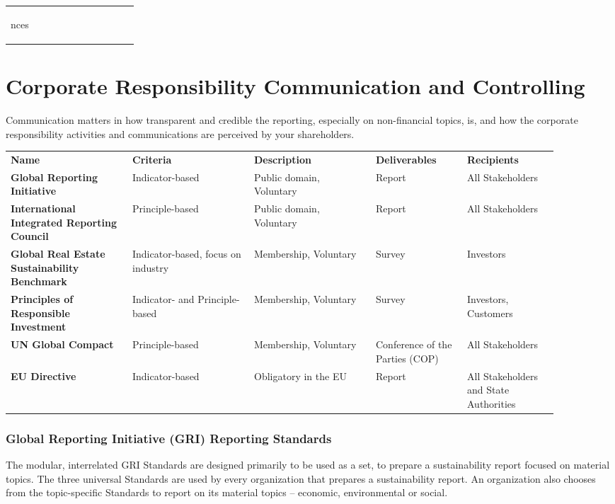 \documentclass[11pt]{article}
\theoremstyle{definition}
\begin{document}
\begin{tabularx}{\linewidth}{p{0.22\linewidth} | p{0.22\linewidth} | p{0.22\linewidth} | p{0.22\linewidth}}
\begin{itemize}
nces
	\end{itemize}
\end{tabularx}

\section{Corporate Responsibility Communication and Controlling}
Communication matters in how transparent and credible the reporting, especially on non-financial topics, is, and how the corporate responsibility activities and communications are perceived by your shareholders.

\begin{tabularx}{\linewidth}{p{0.2\linewidth} p{0.2\linewidth} p{0.2\linewidth} p{0.15\linewidth} p{0.15\linewidth}}
	\cellcolor{SteelBlue1!75}\textbf{Name} & \cellcolor{SteelBlue1!75}\textbf{Criteria} & \cellcolor{SteelBlue1!75}\textbf{Description} & \cellcolor{SteelBlue1!75}\textbf{Deliverables} & \cellcolor{SteelBlue1!75}\textbf{Recipients}\\[0.5em]
	\textbf{Global Reporting Initiative} & Indicator-based & Public domain, Voluntary & Report & All Stakeholders\\[2.5em]
	\textbf{International Integrated Reporting Council} & Principle-based & Public domain, Voluntary & Report & All Stakeholders\\[3.5em]
	\textbf{Global Real Estate Sustainability Benchmark} & Indicator-based, focus on industry & Membership, Voluntary & Survey & Investors\\[3.5em]
	\textbf{Principles of Responsible Investment} & Indicator- and Principle-based & Membership, Voluntary & Survey & Investors, Customers\\[3.5em]
	\textbf{UN Global Compact} & Principle-based & Membership, Voluntary & Conference of the Parties (COP) & All Stakeholders\\[3.5em]
	\textbf{EU Directive} & Indicator-based & Obligatory in the EU & Report & All Stakeholders and State Authorities
\end{tabularx}

\subsubsection{Global Reporting Initiative (GRI) Reporting Standards}
The modular, interrelated GRI Standards are designed primarily to be used as a set, to prepare a sustainability report focused on material topics. The three universal Standards are used by every organization that prepares a sustainability report. An organization also chooses from the topic-specific Standards to report on its material topics – economic, environmental or social.
\end{document}
